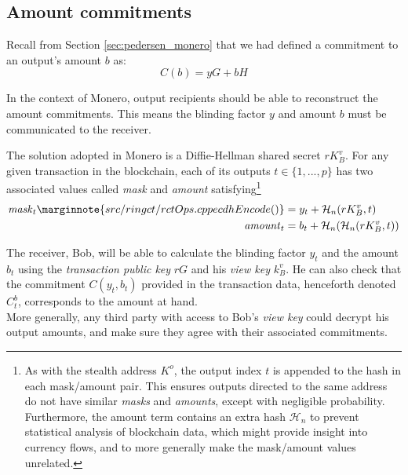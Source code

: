 \subsection{Amount commitments}
\label{amount-commitments}
Recall from Section \ref{sec:pedersen_monero} that we had defined a commitment to an output’s amount $b$ as: 
\[C(b) = y G + b H\]

In the context of Monero, output recipients should be able to reconstruct the amount commitments. This means the blinding factor $y$ and amount $b$ must be communicated to the receiver.

The solution adopted in Monero is a Diffie-Hellman shared secret $r K_B^v$. For any given transaction in the blockchain, each of its outputs $t \in \{1, ..., p\}$ has two associated values called {\em mask} and {\em amount}  satisfying\footnote{As with the stealth address $K^o$, the output index $t$ is appended to the hash in each mask/amount pair. This ensures outputs directed to the same address do not have similar {\em masks} and {\em amounts}, except with negligible probability.
Furthermore, the amount term contains an extra hash $\mathcal{H}_n$ to prevent statistical analysis of blockchain data, which might provide insight into currency flows, and to more generally make the mask/amount values unrelated.}%
\begin{align*}
  \mathit{mask}_t\marginnote{src/ringct/ rctOps.cpp ecdhEncode()}     &= y_t + \mathcal{H}_n(r K_B^v, t) \\
  \mathit{amount}_t   &= b_t + \mathcal{H}_n(\mathcal{H}_n(r K_B^v, t))
\end{align*}

The receiver, Bob, will be able to calculate the blinding factor $y_t$ and the amount $b_t$ using the {\em transaction public key} $r G$ and his {\em view key} $k_B^v$. He can also check that the commitment $C(y_t, b_t)$ provided in the transaction data, henceforth denoted $C_t^b$,  corresponds to the amount at hand.\\

More generally, any third party with access to Bob’s {\em view key} could decrypt his output amounts, and make sure they agree with their associated commitments.



